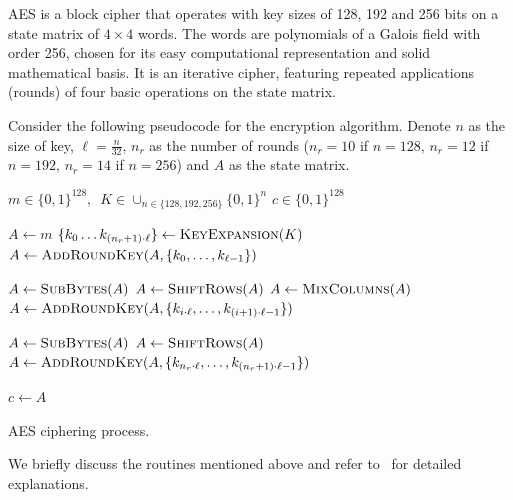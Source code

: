 \documentclass{../sftex/sftex}
\newcommand{\binwds}[1]{\{0, 1\}^{#1}}
\begin{document}
AES is a block cipher that operates with key sizes of 128, 192 and 256 bits on
a state matrix of $4 \times 4$ words. The words are polynomials of a Galois
field with order 256, chosen for its easy computational representation and
solid mathematical basis. It is an iterative cipher, featuring repeated
applications (rounds) of four basic operations on the state matrix.

Consider the following pseudocode for the encryption algorithm. Denote $n$ as
the size of key, $\ell = \frac{n}{32}$, $n_r$ as the number of rounds ($n_r =
10$ if $n = 128$, $n_r = 12$ if $n = 192$, $n_r = 14$ if $n = 256$) and $A$ as
the state matrix.

\begin{algorithm}
  \begin{algorithmic}
    \REQUIRE{}  $m \in \binwds{128}, \enspace
      K \in \cup_{n \in \{128, 192, 256\}} \binwds{n}$
        \ENSURE{}  $c \in \binwds{128}$ 

    \STATE{}  $A \leftarrow m$
    \STATE{}  $\{k_{0} \dots k_{(n_{r} + 1) \cdot \ell}\}
      \leftarrow \textsc{KeyExpansion}(K)$
    \STATE{}  $A \leftarrow \textsc{AddRoundKey}(A,
      \{k_{0}, \dots, k_{\ell - 1}\})$

      \STATE{}  $A \leftarrow \textsc{SubBytes}(A)$
      \STATE{}  $A \leftarrow \textsc{ShiftRows}(A)$
      \STATE{}  $A \leftarrow \textsc{MixColumns}(A)$
      \STATE{}  $A \leftarrow \textsc{AddRoundKey}(A,
        \{k_{i \cdot \ell}, \dots, k_{(i + 1) \cdot \ell - 1}\})$
    \ENDFOR{}

    \STATE{}  $A \leftarrow \textsc{SubBytes}(A)$
    \STATE{}  $A \leftarrow \textsc{ShiftRows}(A)$
    \STATE{}  $A \leftarrow \textsc{AddRoundKey}(A,
      \{k_{n_{r} \cdot \ell}, \dots, k_{(n_{r} + 1) \cdot \ell - 1}\})$

    \STATE{}  $c \leftarrow A$
  \end{algorithmic}
  \caption{AES ciphering process.}
\end{algorithm}

We briefly discuss the routines mentioned above and refer
to~\cite{Daemen:book:2002} for detailed explanations.
\end{document}
